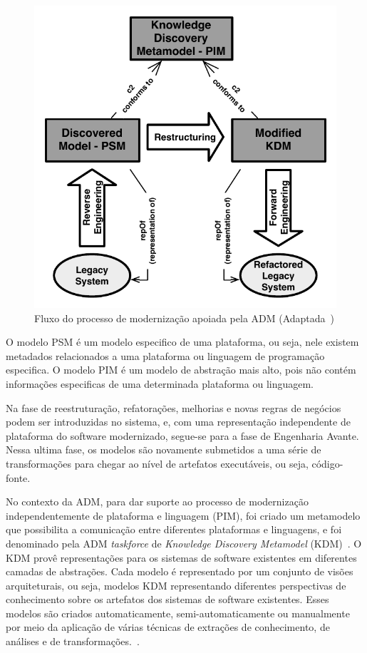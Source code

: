 \begin{figure}[!ht]
\centering
  \includegraphics[scale=0.65]{figuras/horseShoe}
\caption{Fluxo do processo de modernização apoiada pela ADM (Adaptada~\citep{OMGADM})}
\label{fig:ADM_horse_shoes}
\end{figure}

O modelo PSM é um modelo especifico de uma plataforma, ou seja, nele existem metadados relacionados a uma plataforma ou linguagem de programação especifica. O modelo PIM é um modelo de abstração mais alto, pois não contém informações especificas de uma determinada plataforma ou linguagem.

Na fase de reestruturação, refatorações, melhorias e novas regras de negócios podem ser introduzidas no sistema, e, com uma representação independente de plataforma do software modernizado, segue-se para a fase de Engenharia Avante. Nessa ultima fase, os modelos são novamente submetidos a uma série de transformações para chegar ao nível de artefatos executáveis, ou seja, código-fonte.

No contexto da ADM, para dar suporte ao processo de modernização independentemente de plataforma e linguagem (PIM), foi criado um metamodelo que possibilita a comunicação entre diferentes plataformas e linguagens, e foi denominado pela ADM \textit{taskforce} de \textit{Knowledge Discovery Metamodel} (KDM)~\citep{ISOKDM}. O KDM provê representações para os sistemas de software existentes em diferentes camadas de abstrações. Cada modelo é representado por um conjunto de visões arquiteturais, ou seja, modelos KDM representando diferentes perspectivas de conhecimento sobre os artefatos dos sistemas de software existentes. Esses modelos são criados automaticamente, semi-automaticamente ou manualmente por meio da aplicação de várias técnicas de extrações de conhecimento, de análises e de transformações.~\citep{PerezCastillo:2011jo}.

